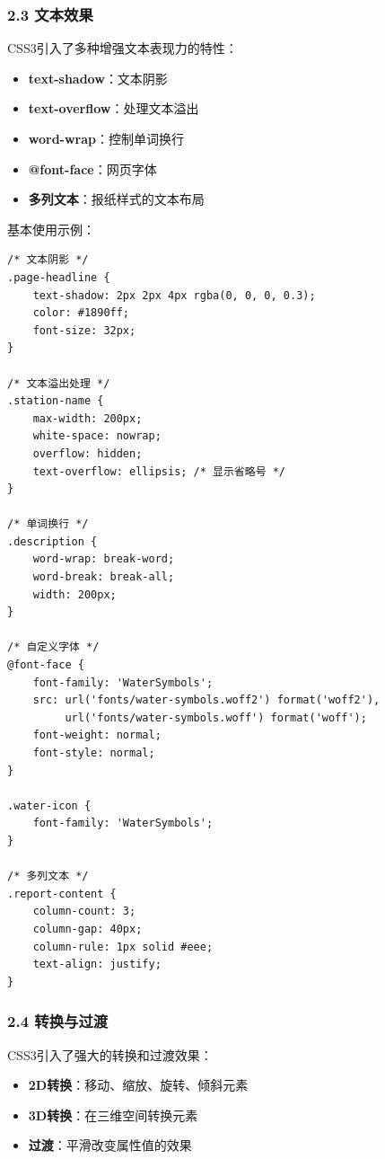 \subsubsection{2.3 文本效果}\label{ux6587ux672cux6548ux679c}

CSS3引入了多种增强文本表现力的特性：

\begin{itemize}
\tightlist
\item
  \textbf{text-shadow}：文本阴影
\item
  \textbf{text-overflow}：处理文本溢出
\item
  \textbf{word-wrap}：控制单词换行
\item
  \textbf{@font-face}：网页字体
\item
  \textbf{多列文本}：报纸样式的文本布局
\end{itemize}

基本使用示例：

\begin{lstlisting}
/* 文本阴影 */
.page-headline {
    text-shadow: 2px 2px 4px rgba(0, 0, 0, 0.3);
    color: #1890ff;
    font-size: 32px;
}

/* 文本溢出处理 */
.station-name {
    max-width: 200px;
    white-space: nowrap;
    overflow: hidden;
    text-overflow: ellipsis; /* 显示省略号 */
}

/* 单词换行 */
.description {
    word-wrap: break-word;
    word-break: break-all;
    width: 200px;
}

/* 自定义字体 */
@font-face {
    font-family: 'WaterSymbols';
    src: url('fonts/water-symbols.woff2') format('woff2'),
         url('fonts/water-symbols.woff') format('woff');
    font-weight: normal;
    font-style: normal;
}

.water-icon {
    font-family: 'WaterSymbols';
}

/* 多列文本 */
.report-content {
    column-count: 3;
    column-gap: 40px;
    column-rule: 1px solid #eee;
    text-align: justify;
}
\end{lstlisting}

\subsubsection{2.4 转换与过渡}\label{ux8f6cux6362ux4e0eux8fc7ux6e21}

CSS3引入了强大的转换和过渡效果：

\begin{itemize}
\tightlist
\item
  \textbf{2D转换}：移动、缩放、旋转、倾斜元素
\item
  \textbf{3D转换}：在三维空间转换元素
\item
  \textbf{过渡}：平滑改变属性值的效果
\end{itemize}

